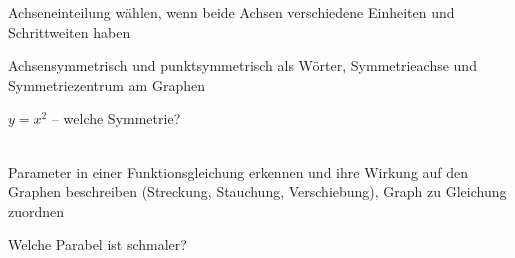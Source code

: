 \begin{aufgabe}{Achseneinteilung wählen, wenn beide Achsen verschiedene Einheiten und Schrittweiten haben}
\end{aufgabe}

\begin{aufgabe}{Achsensymmetrisch und punktsymmetrisch als Wörter, Symmetrieachse und Symmetriezentrum am Graphen}
\begin{teile}
\teil $y = x^2$ – welche Symmetrie?\\ \\ 
\end{teile}
\end{aufgabe}

\begin{aufgabe}{Parameter in einer Funktionsgleichung erkennen und ihre Wirkung auf den Graphen beschreiben (Streckung, Stauchung, Verschiebung), Graph zu Gleichung zuordnen}
\begin{teile}
\teil Welche Parabel ist schmaler?\\ \\ 
\end{teile}
\end{aufgabe}

